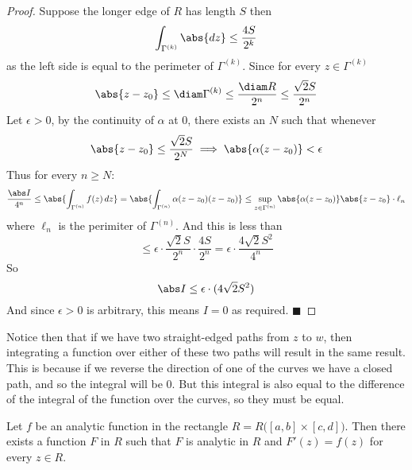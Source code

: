 \documentclass[10pt]{article}
\def\qed{\hskip1cm\hbox{}\hfill$\blacksquare$}
\begin{document}
\begin{proof}
    Suppose the longer edge of $R$ has length $S$ then
    \[ \int_{\Gamma^{(k)}} \abs{dz} \leq \frac{4S}{2^k} \]
    as the left side is equal to the perimeter of $\Gamma^{(k)}$.
    Since for every $z\in\Gamma^{(k)}$
    \[ \abs{z-z_0}\leq\diam\Gamma^{(k)}\leq\frac{\diam R}{2^n}\leq\frac{\sqrt 2S}{2^n} \]
    Let $\epsilon>0$, by the continuity of $\alpha$ at $0$, there exists an $N$ such that whenever
    \[ \abs{z-z_0} \leq \frac{\sqrt 2S}{2^N} \implies \abs{\alpha(z-z_0)}<\epsilon \]
    Thus for every $n\geq N$:
    \[ \frac{\abs I}{4^n} \leq \abs{\int_{\Gamma^{(n)}} f(z)\,dz} = \abs{\int_{\Gamma^{(n)}}\alpha(z-z_0)(z-z_0)} \leq \sup_{z\in\Gamma^{(n)}}\abs{\alpha(z-z_0)}\abs{z-z_0}\cdot\ell_n \]
    where $\ell_n$ is the perimiter of $\Gamma^{(n)}$.
    And this is less than
    \[ \leq \epsilon\cdot\frac{\sqrt2S}{2^n}\cdot\frac{4S}{2^n} = \epsilon\cdot\frac{4\sqrt2S^2}{4^n} \]
    So
    \[ \abs I \leq \epsilon\cdot(4\sqrt2S^2) \]
    And since $\epsilon>0$ is arbitrary, this means $I=0$ as required.
    \qed

\end{proof}

Notice then that if we have two straight-edged paths from $z$ to $w$, then integrating a function over either of these two paths will result in the same result.
This is because if we reverse the direction of one of the curves we have a closed path, and so the integral will be $0$.
But this integral is also equal to the difference of the integral of the function over the curves, so they must be equal.

\begin{thrm*}

    Let $f$ be an analytic function in the rectangle $R=R\bigl([a,b]\times[c,d]\bigr)$.
    Then there exists a function $F$ in $R$ such that $F$ is analytic in $R$ and $F'(z)=f(z)$ for every $z\in R$.

\end{thrm*}
\end{document}
